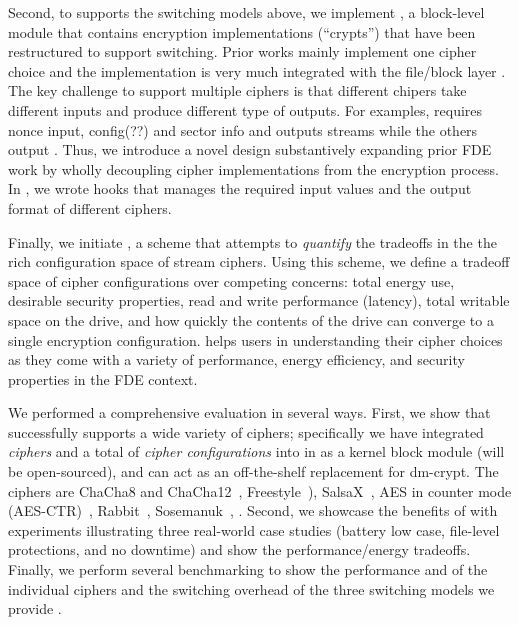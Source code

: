 Second, to supports the switching models above, we implement \sysB, a
block-level module that contains encryption implementations (``crypts'')
that have been restructured to support switching.  Prior works mainly
implement one cipher choice and the implementation is very much integrated
with the file/block layer \cite{StrongBox, any-other-works-like-this?}.
The key challenge to support multiple ciphers is that different chipers
take different inputs and produce different type of outputs.  For
examples, \encA requires nonce input, \encB config(??\xxx) and \encC
sector info and \encC outputs streams while the others output \xxx.  Thus,
we introduce a novel design substantively expanding prior FDE work by
wholly decoupling cipher implementations from the encryption process.  In
\sysB, we wrote hooks that manages the required input values and the
output format of different ciphers.


Finally, we initiate \sysC, a scheme that attempts to {\em quantify} the
tradeoffs in the the rich configuration space of stream ciphers.  Using
this scheme, we define a tradeoff space of cipher configurations over
competing concerns: total energy use, desirable security properties, read
and write performance (latency), total writable space on the drive, and
how quickly the contents of the drive can converge to a single encryption
configuration.  \sysC helps users in understanding their cipher choices as
they come with a variety of performance, energy efficiency, and security
properties in the FDE context.


We performed a comprehensive evaluation in several ways.
%
First, we show that \sys successfully supports a wide variety of ciphers;
specifically we have integrated {\em \numCiphers ciphers} and a total of
{\em \numConfigs cipher configurations} into \sys in \locTotal as a kernel
block module (will be open-sourced), and can act as an off-the-shelf
replacement for dm-crypt.  The ciphers are ChaCha8 and
ChaCha12~\cite{ChaCha20}, Freestyle~\cite{Freestyle}),
SalsaX~\cite{SalsaX}, AES in counter mode (AES-CTR)~\cite{AESCTR},
Rabbit~\cite{Rabbit}, Sosemanuk~\cite{Sosemanuk}, \xxx.
%
Second, we showcase the benefits of \sys with experiments illustrating
three real-world case studies (battery low case, file-level protections,
and no downtime) and show the performance/energy tradeoffs.
%
Finally, we perform several benchmarking to show the performance and \xxx
of the individual ciphers and the switching overhead of the three
switching models we provide .



